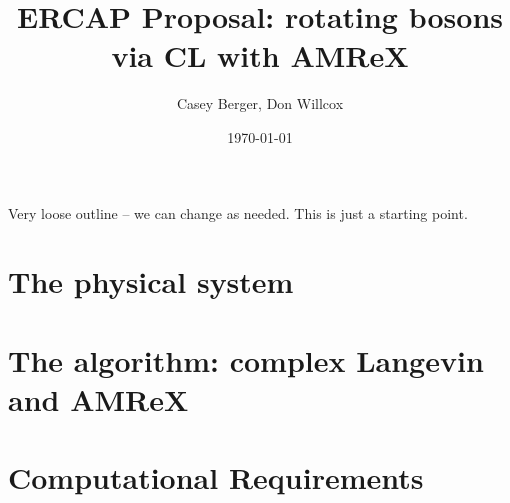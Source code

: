 \documentclass[onecolumn, 12pt]{report}
\title{ERCAP Proposal: rotating bosons via CL with AMReX}
\author{Casey Berger, Don Willcox}
\date{\today}
\begin{document}
Very loose outline -- we can change as needed. This is just a starting point.
\section{The physical system}

\section{The algorithm: complex Langevin and AMReX}

\section{Computational Requirements}
\end{document}
